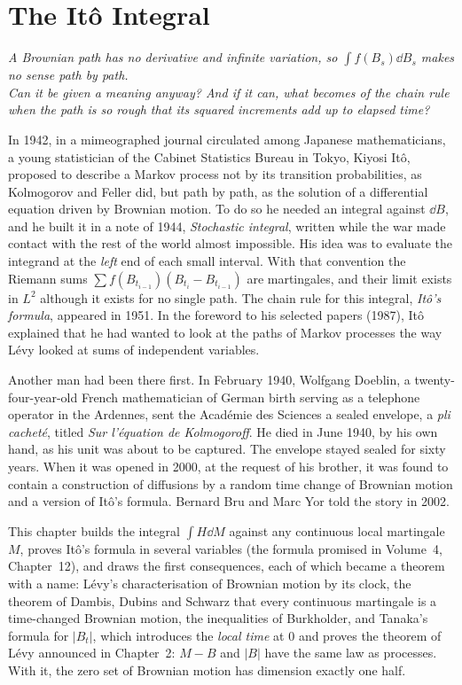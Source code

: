 \chapter{The It\^o Integral}

\begin{center}\itshape
A Brownian path has no derivative and infinite variation, so $\int f(B_s)\dd B_s$ makes no sense path by path.\\
Can it be given a meaning anyway? And if it can, what becomes of the chain rule\\
when the path is so rough that its squared increments add up to elapsed time?
\end{center}

In 1942, in a mimeographed journal circulated among Japanese mathematicians, a young statistician of the Cabinet Statistics Bureau in Tokyo, Kiyosi It\^o, proposed to describe a Markov
process not by its transition probabilities, as Kolmogorov and Feller did, but path by path, as the solution of a differential equation driven by Brownian motion. To do so he needed an
integral against $\dd B$, and he built it in a note of 1944, \emph{Stochastic integral}, written while the war made contact with the rest of the world almost impossible. His idea was to
evaluate the integrand at the \emph{left} end of each small interval. With that convention the Riemann sums $\sum f(B_{t_{i-1}})(B_{t_i}-B_{t_{i-1}})$ are martingales, and their limit
exists in $L^2$ although it exists for no single path. The chain rule for this integral, \emph{It\^o's formula}, appeared in 1951. In the foreword to his selected papers (1987), It\^o explained
that he had wanted to look at the paths of Markov processes the way L\'evy looked at sums of independent variables.

Another man had been there first. In February 1940, Wolfgang Doeblin, a twenty-four-year-old French mathematician of German birth serving as a telephone operator in the Ardennes, sent the
Acad\'emie des Sciences a sealed envelope, a \emph{pli cachet\'e}, titled \emph{Sur l'\'equation de Kolmogoroff}. He died in June 1940, by his own hand, as his unit was about to be captured.
The envelope stayed sealed for sixty years. When it was opened in 2000, at the request of his brother, it was found to contain a construction of diffusions by a random time change of Brownian
motion and a version of It\^o's formula. Bernard Bru and Marc Yor told the story in 2002.

This chapter builds the integral $\int H\dd M$ against any continuous local martingale $M$, proves It\^o's formula in several variables (the formula promised in Volume~4, Chapter~12), and draws
the first consequences, each of which became a theorem with a name: L\'evy's characterisation of Brownian motion by its clock, the theorem of Dambis, Dubins and Schwarz that every continuous
martingale is a time-changed Brownian motion, the inequalities of Burkholder, and Tanaka's formula for $|B_t|$, which introduces the \emph{local time} at $0$ and proves the theorem of L\'evy announced
in Chapter~2: $M-B$ and $|B|$ have the same law as processes. With it, the zero set of Brownian motion has dimension exactly one half.

